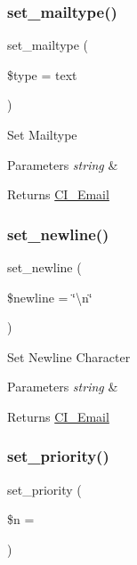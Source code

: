 \subsubsection{\texorpdfstring{set\+\_\+mailtype()}{set\_mailtype()}}
{\footnotesize\ttfamily set\+\_\+mailtype (\begin{DoxyParamCaption}\item[{}]{\$type = {\ttfamily \textquotesingle{}text\textquotesingle{}} }\end{DoxyParamCaption})}

Set Mailtype


\begin{DoxyParams}{Parameters}
{\em string} & \\
\hline
\end{DoxyParams}
\begin{DoxyReturn}{Returns}
\mbox{\hyperlink{class_c_i___email}{C\+I\+\_\+\+Email}} 
\end{DoxyReturn}
\mbox{\label{class_c_i___email_aa8661a0f33afb4df33d4f6f935b36a49}} 
\subsubsection{\texorpdfstring{set\+\_\+newline()}{set\_newline()}}
{\footnotesize\ttfamily set\+\_\+newline (\begin{DoxyParamCaption}\item[{}]{\$newline = {\ttfamily \char`\"{}\textbackslash{}n\char`\"{}} }\end{DoxyParamCaption})}

Set Newline Character


\begin{DoxyParams}{Parameters}
{\em string} & \\
\hline
\end{DoxyParams}
\begin{DoxyReturn}{Returns}
\mbox{\hyperlink{class_c_i___email}{C\+I\+\_\+\+Email}} 
\end{DoxyReturn}
\mbox{\label{class_c_i___email_aee3ae37c0bf5f8aca34f6e872efd66b8}} 
\subsubsection{\texorpdfstring{set\+\_\+priority()}{set\_priority()}}
{\footnotesize\ttfamily set\+\_\+priority (\begin{DoxyParamCaption}\item[{}]{\$n = {} }\end{DoxyParamCaption})}

